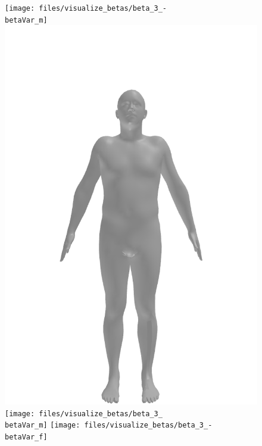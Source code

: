\begin{figure}[ht!]
    \centering

    \begin{minipage}[b]{\textwidth}
        \centering
        \texttt{[image: files/visualize\_betas/beta\_3\_-\\betaVar\_m]}
        \includegraphics[width=\imgWidth]{files/visualize_betas/baseline_m}
        \texttt{[image: files/visualize\_betas/beta\_3\_\\betaVar\_m]}
        \linebreak
        \texttt{[image: files/visualize\_betas/beta\_3\_-\\betaVar\_f]}

\end{minipage}
\end{figure}
